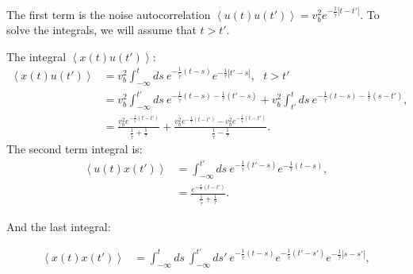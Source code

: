 \documentclass[%
10pt,
superscriptaddress,
twocolumn,
 amsmath,amssymb,
 aps,prx,
]{revtex4-2}
\begin{document}
The first term is the noise autocorrelation $\left<u(t)u(t')\right> =v_b^2 e^{-\frac{1}{\tilde{\tau}}|t-t'|}$. To solve the integrals, we will assume that $t>t'$.

The integral $\left<x(t)u(t')\right>$:
\begin{align}
	\left<x(t)u(t')\right> &= v_b^2\int_{-\infty}^{t}ds \  e^{-\frac{1}{\tilde{\tau}}(t-s)}e^{-\frac{1}{\tau}|t'-s|}, \ \ \ t>t'\\
	&=v_b^2\int_{-\infty}^{t'}ds \ e^{-\frac{1}{\tilde{\tau}}(t-s)-\frac{1}{\tau}(t'-s)}+v_b^2\int_{t'}^{t}ds \ e^{-\frac{1}{\tilde{\tau}}(t-s)-\frac{1}{\tau}(s-t')}, \\
	&=\frac{v_b^2e^{-\frac{1}{\tilde{\tau}}(t-t')}}{\frac{1}{\tilde{\tau}}+\frac{1}{\tau}}+\frac{v_b^2e^{-\frac{1}{\tau}(t-t')}-v_b^2e^{-\frac{1}{\tilde{\tau}}(t-t')}}{\frac{1}{\tilde{\tau}}-\frac{1}{\tau}}.
\end{align}
The second term integral is:
\begin{align}
	\left<u(t)x(t')\right> &= \int_{-\infty}^{t'}ds \ e^{-\frac{1}{\tilde{\tau}}(t'-s)}e^{-\frac{1}{\tau}(t-s)},\\
	&=\frac{e^{-\frac{1}{\tau}(t-t')}}{\frac{1}{\tilde{\tau}}+\frac{1}{\tau}}.
\end{align}

And the last integral:

\begin{align}
	\left<x(t)x(t')\right> &= \int_{-\infty}^{t}ds \ \int_{-\infty}^{t'}ds' \ e^{-\frac{1}{\tilde{\tau}}(t-s)}e^{-\frac{1}{\tilde{\tau}}(t'-s')}e^{-\frac{1}{\tau}|s-s'|},  \\
\end{align}
\end{document}
